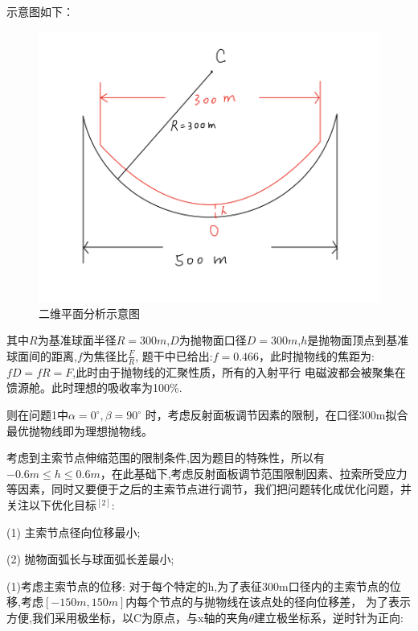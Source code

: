\documentclass[withoutpreface,bwprint]{cumcmthesis} %
\begin{document}
        示意图如下：
        \begin{figure}[H]
    
            \centering
            \includegraphics[scale=0.5]{images/shiyi.png}
            \caption{二维平面分析示意图}
        \end{figure}


其中$R$为基准球面半径$R=300m$,$D$为抛物面口径$D=300m$,$h$是抛物面顶点到基准球面间的距离,$f$为焦径比$\frac{F}{R}$,
题干中已给出:$f=0.466$，此时抛物线的焦距为:$fD =fR=F$,此时由于抛物线的汇聚性质，所有的入射平行
电磁波都会被聚集在馈源舱。此时理想的吸收率为100\%.
    
则在问题1中$ \alpha = 0^\circ ,\beta = 90^\circ$ 时，考虑反射面板调节因素的限制，在口径300m拟合最优抛物线即为理想抛物线。

考虑到主索节点伸缩范围的限制条件,因为题目的特殊性，所以有 $−0.6m≤h≤0.6m $，在此基础下,考虑反射面板调节范围限制因素、拉索所受应力
等因素，同时又要便于之后的主索节点进行调节，我们把问题转化成优化问题，并关注以下优化目标$^{[2]}$:

(1) 主索节点径向位移最小;

(2) 抛物面弧长与球面弧长差最小;


\hspace*{\fill}

\hspace*{\fill}

(1)考虑主索节点的位移: 
对于每个特定的h,为了表征300m口径内的主索节点的位移,考虑$[-150m,150m]$内每个节点的与抛物线在该点处的径向位移差，
为了表示方便,我们采用极坐标，以C为原点，与x轴的夹角$\theta$建立极坐标系，逆时针为正向:
\end{document}
